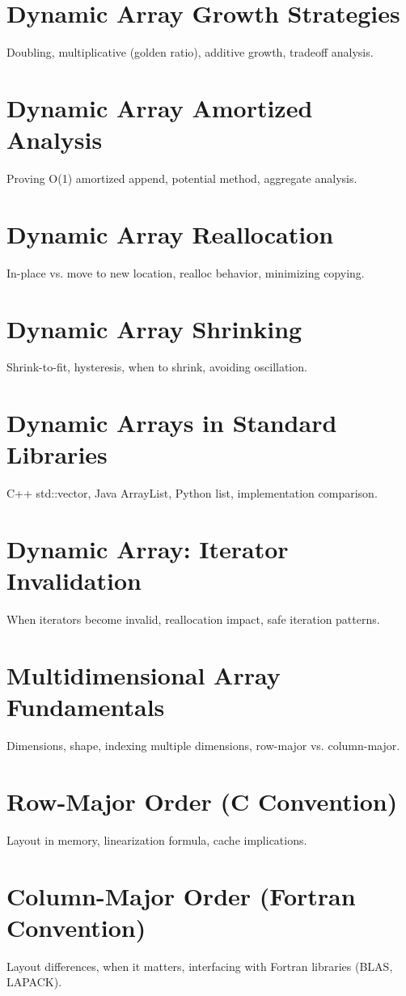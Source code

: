 \chapter{Dynamic Array Growth Strategies}
Doubling, multiplicative (golden ratio), additive growth, tradeoff analysis.

\chapter{Dynamic Array Amortized Analysis}
Proving O(1) amortized append, potential method, aggregate analysis.

\chapter{Dynamic Array Reallocation}
In-place vs. move to new location, realloc behavior, minimizing copying.

\chapter{Dynamic Array Shrinking}
Shrink-to-fit, hysteresis, when to shrink, avoiding oscillation.

\chapter{Dynamic Arrays in Standard Libraries}
C++ std::vector, Java ArrayList, Python list, implementation comparison.

\chapter{Dynamic Array: Iterator Invalidation}
When iterators become invalid, reallocation impact, safe iteration patterns.

\chapter{Multidimensional Array Fundamentals}
Dimensions, shape, indexing multiple dimensions, row-major vs. column-major.

\chapter{Row-Major Order (C Convention)}
Layout in memory, linearization formula, cache implications.

\chapter{Column-Major Order (Fortran Convention)}
Layout differences, when it matters, interfacing with Fortran libraries (BLAS, LAPACK).

